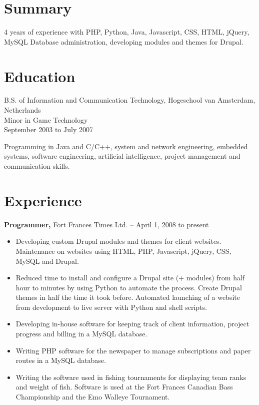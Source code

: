 \documentclass{res}
\begin{document}
\address{125 Third St. E\\Fort Frances, ON\\P9A 1P6\\
  bram@vanderkroef.net\\http://www.vanderkroef.net\\github.com/BramvdKroef}

\begin{resume}

\section{Summary}
\label{sec:summary}
 4 years of experience with PHP, Python, Java, Javascript, CSS, HTML,
 jQuery, MySQL Database administration, developing modules and themes
 for Drupal.

\section{Education}
\label{sec:edu}
B.S. of Information and Communication Technology, Hogeschool van
Amsterdam, Netherlands \\
Minor in Game Technology \\
September 2003 to July 2007

Programming in Java and C/C++, system and network engineering,
embedded systems, software engineering, artificial intelligence,
project management and communication skills.
  
\section{Experience}
\label{sec:experience}

{\bf Programmer,} Fort Frances Times Ltd. -- April 1, 2008 to present
\begin{itemize} \itemsep -2pt
\item Developing custom Drupal modules and themes for client
  websites. Maintenance on websites using HTML, PHP, Javascript,
  jQuery, CSS, MySQL and Drupal.
  \item Reduced time to install and configure a Drupal site (+
    modules) from half hour to minutes by using Python to automate the
    process. Create Drupal themes in half the time it took
    before. Automated launching of a website from development to live
    server with Python and shell scripts.
  \item Developing in-house software for keeping track of client
    information, project progress and billing in a MySQL database.
  \item Writing PHP software for the newspaper to manage subscriptions
    and paper routes in a MySQL database.
  \item Writing the software used in fishing tournaments for displaying
    team ranks and weight of fish. Software is used at the Fort Frances
    Canadian Bass Championship and the Emo Walleye Tournament.


\end{itemize}
\end{resume}
\end{document}
